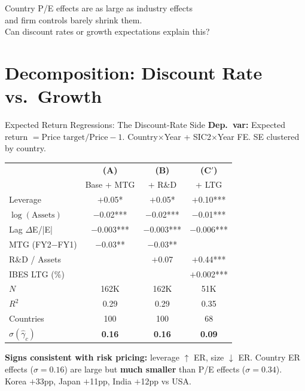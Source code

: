 \documentclass[aspectratio=169, 11pt]{beamer}
\begin{document}
{
\begin{frame}[standout]
\large Country P/E effects are as large as industry effects\\
and firm controls barely shrink them.\\[0.5cm]
\normalsize Can discount rates or growth expectations explain this?
\end{frame}
}

\section{Decomposition: Discount Rate vs.\ Growth}

\begin{frame}{Expected Return Regressions: The Discount-Rate Side}
\vspace{-0.3cm}
\scriptsize
\textbf{Dep.\ var:} Expected return $= \text{Price target} / \text{Price} - 1$. \quad Country$\times$Year + SIC2$\times$Year FE. \quad SE clustered by country.

\vspace{0.05cm}
\renewcommand{\arraystretch}{0.92}
\begin{tabular}{@{}lccc@{}}
\toprule
& \textbf{(A)} & \textbf{(B)} & \textbf{(C$'$)} \\
& Base + MTG & + R\&D & + LTG \\
\midrule
Leverage & $+$0.05* & $+$0.05* & $+$0.10*** \\
$\log(\text{Assets})$ & $-$0.02*** & $-$0.02*** & $-$0.01*** \\
Lag $\Delta$E/|E| & $-$0.003*** & $-$0.003*** & $-$0.006*** \\
MTG (FY2$-$FY1) & $-$0.03** & $-$0.03** & \\
R\&D / Assets & & $+$0.07 & $+$0.44*** \\
IBES LTG (\%) & & & $+$0.002*** \\
\midrule
$N$ & 162K & 162K & 51K \\
$R^2$ & 0.29 & 0.29 & 0.35 \\
Countries & 100 & 100 & 68 \\
$\sigma(\hat\gamma_c)$ & \textbf{0.16} & \textbf{0.16} & \textbf{0.09} \\
\bottomrule
\end{tabular}
\renewcommand{\arraystretch}{1.0}

\vspace{0.05cm}
\scriptsize
\textbf{Signs consistent with risk pricing:} leverage $\uparrow$ ER, size $\downarrow$ ER. Country ER effects ($\sigma = 0.16$) are large but \textbf{much smaller} than P/E effects ($\sigma = 0.34$). Korea $+$33pp, Japan $+$11pp, India $+$12pp vs USA.
\end{frame}
\end{document}
